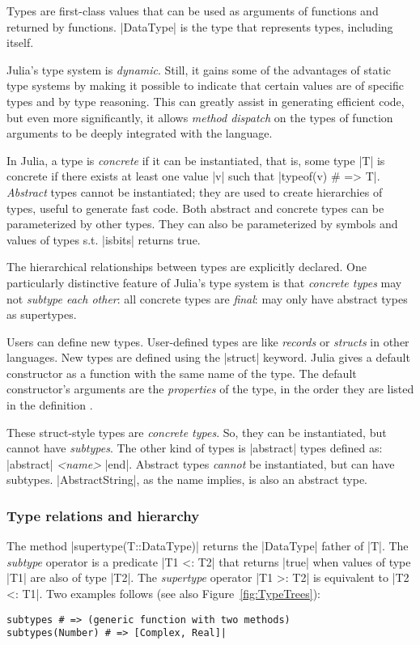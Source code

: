 Types are first-class values that can be used as arguments of functions and returned by functions.
|DataType| is the type that represents types, including itself.


Julia's type system is \emph{dynamic}. Still, it gains some of the advantages of static type systems by making it possible to indicate that certain values are of specific types and by type reasoning. This can greatly assist in generating efficient code, but even more significantly, it allows \emph{method dispatch} on the types of function arguments to be deeply integrated with the language.


In Julia, a type is \emph{concrete} if it can be instantiated, that is, some type
|T| is concrete if there exists at least one value |v| such that
|typeof(v) # => T|. \emph{Abstract} types cannot be instantiated; they are used to create hierarchies of types, useful to generate fast code.
Both abstract and concrete types can be parameterized by other types. They can also be parameterized by symbols and values of types s.t. |isbits| returns true. 

The hierarchical relationships between types are explicitly declared.
One particularly distinctive feature of Julia's type system is that \emph{concrete types} may not \emph{subtype each other}: all concrete types are \emph{final}: may only have abstract types as supertypes.


Users can define new types. User-defined types are like \emph{records} or \emph{structs} in other languages.  New types are defined using the |struct| keyword. Julia gives a default constructor as a function with the same name of the type.
The default constructor's arguments are the \emph{properties} of the type, in the order they are listed in the definition \cite{julia:types}.

These struct-style types are \emph{concrete types}. So, 
they can be instantiated, but cannot have \emph{subtypes}.
The other kind of types is |abstract| types defined as:  
|abstract| \emph{<name>} |end|.
Abstract types \emph{cannot} be instantiated, but can have subtypes.
|AbstractString|, as the name implies, is also an abstract type.


\subsubsection*{Type relations and hierarchy}

The method |supertype(T::DataType)| returns the |DataType| father of |T|.
The \emph{subtype} operator is a predicate |T1 <: T2| that returns |true| when values of type |T1| are also of type |T2|.  
The \emph{supertype} operator |T1 >: T2| is equivalent to |T2 <: T1|. Two examples follows (see also Figure~\ref{fig:TypeTrees}):
\begin{lstlisting}[language=JuliaLocal, style=julia, mathescape = true]
subtypes # => (generic function with two methods)
subtypes(Number) # => [Complex, Real]|
\end{lstlisting}

